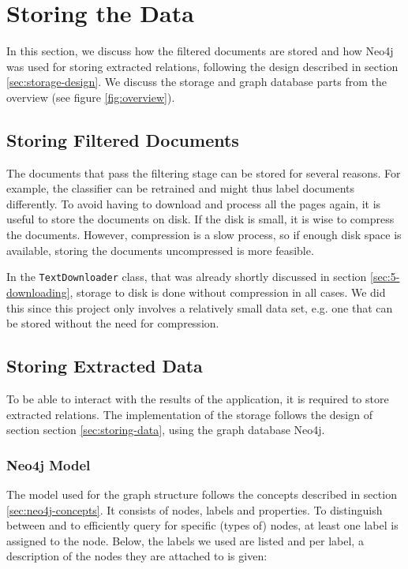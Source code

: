 \section{Storing the Data}\label{sec: 5-storing}
In this section, we discuss how the filtered documents are stored and how Neo4j was used for storing extracted relations, following the design described in section \ref{sec:storage-design}. We discuss the storage and graph database parts from the overview (see figure \ref{fig:overview}).

\subsection{Storing Filtered Documents}
The documents that pass the filtering stage can be stored for several reasons. For example, the classifier can be retrained and might thus label documents differently. To avoid having to download and process all the pages again, it is useful to store the documents on disk. If the disk is small, it is wise to compress the documents. However, compression is a slow process, so if enough disk space is available, storing the documents uncompressed is more feasible.

In the \texttt{TextDownloader} class, that was already shortly discussed in section \ref{sec:5-downloading}, storage to disk is done without compression in all cases. We did this since this project only involves a relatively small data set, e.g. one that can be stored without the need for compression.

\subsection{Storing Extracted Data}
To be able to interact with the results of the application, it is required to store extracted relations. The implementation of the storage follows the design of section section \ref{sec:storing-data}, using the graph database Neo4j.

\subsubsection{Neo4j Model}
The model used for the graph structure follows the concepts described in section \ref{sec:neo4j-concepts}. It consists of nodes, labels and properties. To distinguish between and to efficiently query for specific (types of) nodes, at least one label is assigned to the node. Below, the labels we used are listed and per label, a description of the nodes they are attached to is given:

